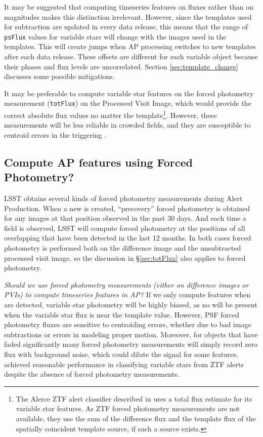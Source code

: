 \documentclass[DM,authoryear,toc]{lsstdoc}
\begin{document}
It may be suggested that computing timeseries features on fluxes rather than on magnitudes makes this distinction irrelevant.  
However, since the templates used for subtraction are updated in every data release, this means that the range of \texttt{psFlux} values for variable stars will change with the images used in the templates.  
This will create jumps when AP processing switches to new templates after each data release.
These offsets are different for each variable object because their phases and flux levels are uncorrelated.
Section \ref{sec:template_change} discusses some possible mitigations.

It may be preferable to compute variable star features on the forced photometry measurement (\texttt{totFlux}) on the Processed Visit Image, which would provide the correct absolute flux values no matter the template\footnote{The Alerce ZTF alert classifier described in \citet{Sanchez-Saez:21:AlertClassification} uses a total flux estimate for its variable star features.  
As ZTF forced photometry measurements are not available, they use the sum of the difference flux and the template flux of the spatially coincident template source, if such a source exists.}. 
However, these measurements will be less reliable in crowded fields, and they are susceptible to centroid errors in the triggering \DIASource.


\subsection{Compute AP features using Forced Photometry?}

LSST obtains several kinds of forced photometry measurements during Alert Production.
When a new \DIAObject is created, ``precovery'' forced photometry is obtained for any images at that position observed in the past 30 days.
And each time a field is observed, LSST will compute forced photometry at the positions of all overlapping \DIAObjects that have been detected in the last 12 months.
In both cases forced photometry is performed both on the difference image and the unsubtracted processed visit image, so the discussion in \S \ref{sec:totFlux} also applies to forced photometry.

\textit{Should we use forced photometry measurements (either on difference images or PVIs) to compute timeseries features in AP?}
If we only compute features when \DIASources are detected, variable star photometry will be highly biased, as no \DIASources will be present when the variable star flux is near the template value.
However, PSF forced photometry fluxes are sensitive to centroiding errors, whether due to bad image subtractions or errors in modeling proper motion.
Moreover, for objects that have faded significantly many forced photometry measurements will simply record zero flux with background noise, which could dilute the signal for some features.
\citet{Sanchez-Saez:21:AlertClassification} achieved reasonable performance in classifying variable stars from ZTF alerts despite the absence of forced photometry measurements.
\end{document}
